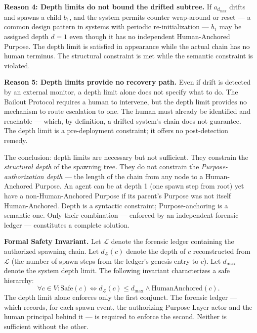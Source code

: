 \medskip
\noindent\textbf{Reason 4: Depth limits do not bound the drifted subtree.}
If $a_{d_{\max}}$ drifts and spawns a child $b_1$, and the system permits counter wrap-around or reset — a common design pattern in systems with periodic re-initialization — $b_1$ may be assigned depth $d=1$ even though it has no independent Human-Anchored Purpose. The depth limit is satisfied in appearance while the actual chain has no human terminus. The structural constraint is met while the semantic constraint is violated.

\medskip
\noindent\textbf{Reason 5: Depth limits provide no recovery path.}
Even if drift is detected by an external monitor, a depth limit alone does not specify what to do. The Bailout Protocol requires a human to intervene, but the depth limit provides no mechanism to route escalation to one. The human must already be identified and reachable — which, by definition, a drifted system's chain does not guarantee. The depth limit is a pre-deployment constraint; it offers no post-detection remedy.

The conclusion: depth limits are necessary but not sufficient. They constrain the \textit{structural depth} of the spawning tree. They do not constrain the \textit{Purpose-authorization depth} — the length of the chain from any node to a Human-Anchored Purpose. An agent can be at depth 1 (one spawn step from root) yet have a non-Human-Anchored Purpose if its parent's Purpose was not itself Human-Anchored. Depth is a syntactic constraint; Purpose-anchoring is a semantic one. Only their combination — enforced by an independent forensic ledger — constitutes a complete solution.

\medskip
\noindent\textbf{Formal Safety Invariant.}
Let $\mathcal{L}$ denote the forensic ledger containing the authorized spawning chain. Let $d_{\mathcal{L}}(c)$ denote the depth of $c$ reconstructed from $\mathcal{L}$ (the number of spawn steps from the ledger's genesis entry to $c$). Let $d_{\max}$ denote the system depth limit. The following invariant characterizes a safe hierarchy:
\[
\forall c \in V : \text{Safe}(c) \iff d_{\mathcal{L}}(c) \leq d_{\max} \land \text{HumanAnchored}(c).
\]
The depth limit alone enforces only the first conjunct. The forensic ledger — which records, for each spawn event, the authorizing Purpose Layer actor and the human principal behind it — is required to enforce the second. Neither is sufficient without the other.

